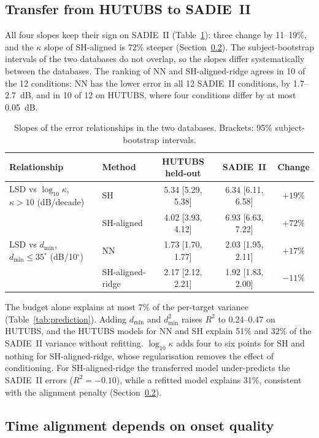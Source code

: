 \documentclass[11pt,a4paper]{article}
\newcommand{\dmin}{d_{\min}}
\begin{document}
\subsection{Transfer from HUTUBS to SADIE~II}
\label{sec:transfer}

All four slopes keep their sign on SADIE~II (Table~\ref{tab:transfer}): three change by 11--19\%, and the $\kappa$ slope of SH-aligned is 72\% steeper (Section~\ref{sec:alignment}). The subject-bootstrap intervals of the two databases do not overlap, so the slopes differ systematically between the databases. The ranking of NN and SH-aligned-ridge agrees in 10 of the 12 conditions: NN has the lower error in all 12 SADIE~II conditions, by 1.7--2.7~dB, and in 10 of 12 on HUTUBS, where four conditions differ by at most 0.05~dB.

\begin{table}[t]
\centering
\caption{Slopes of the error relationships in the two databases. Brackets: 95\% subject-bootstrap intervals.}
\label{tab:transfer}
\footnotesize\setlength{\tabcolsep}{5pt}
\begin{tabular}{llccc}
\toprule
Relationship & Method & HUTUBS held-out & SADIE~II & Change \\
\midrule
LSD vs $\log_{10}\kappa$, $\kappa>10$ (dB/decade) & SH & 5.34 [5.29, 5.38] & 6.34 [6.11, 6.58] & $+19\%$ \\
 & SH-aligned & 4.02 [3.93, 4.12] & 6.93 [6.63, 7.22] & $+72\%$ \\
LSD vs $\dmin$, $\dmin\le35^\circ$ (dB/10$^\circ$) & NN & 1.73 [1.70, 1.77] & 2.03 [1.95, 2.11] & $+17\%$ \\
 & SH-aligned-ridge & 2.17 [2.12, 2.21] & 1.92 [1.83, 2.00] & $-11\%$ \\
\bottomrule
\end{tabular}
\end{table}

The budget alone explains at most 7\% of the per-target variance (Table~\ref{tab:prediction}). Adding $\dmin$ and $\dmin^2$ raises $R^2$ to 0.24--0.47 on HUTUBS, and the HUTUBS models for NN and SH explain 51\% and 32\% of the SADIE~II variance without refitting. $\log_{10}\kappa$ adds four to six points for SH and nothing for SH-aligned-ridge, whose regularisation removes the effect of conditioning. For SH-aligned-ridge the transferred model under-predicts the SADIE~II errors ($R^2=-0.10$), while a refitted model explains 31\%, consistent with the alignment penalty (Section~\ref{sec:alignment}).

\subsection{Time alignment depends on onset quality}
\label{sec:alignment}
\end{document}
